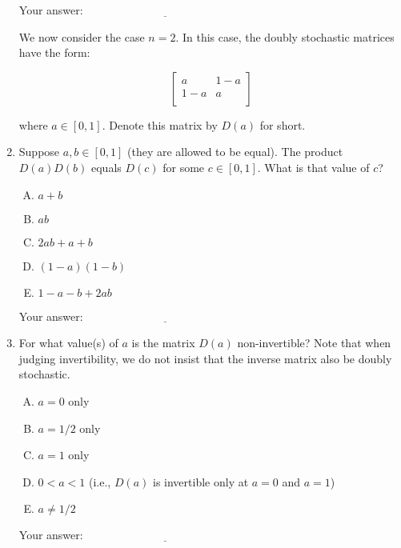 \documentclass[10pt]{amsart}
\begin{document}
\begin{enumerate}
  \vspace{0.1in}
  Your answer: $\underline{\qquad\qquad\qquad\qquad\qquad\qquad\qquad}$
  \vspace{0.6in}

  We now consider the case $n = 2$. In this case, the doubly
  stochastic matrices have the form:

  $$\left[ \begin{matrix} a & 1 - a \\ 1 - a & a \\\end{matrix}\right]$$

  where $a \in [0,1]$. Denote this matrix by $D(a)$ for short.

\item Suppose $a,b \in [0,1]$ (they are allowed to be equal). The
  product $D(a)D(b)$ equals $D(c)$ for some $c \in [0,1]$. What is
  that value of $c$?

  \begin{enumerate}[(A)]
  \item $a + b$
  \item $ab$
  \item $2ab + a + b$
  \item $(1 - a)(1 - b)$
  \item $1 - a - b + 2ab$
  \end{enumerate}

  \vspace{0.1in}
  Your answer: $\underline{\qquad\qquad\qquad\qquad\qquad\qquad\qquad}$
  \vspace{0.1in}

\item For what value(s) of $a$ is the matrix $D(a)$ non-invertible?
  Note that when judging invertibility, we do not insist that the
  inverse matrix also be doubly stochastic.

  \begin{enumerate}[(A)]
  \item $a = 0$ only
  \item $a = 1/2$ only
  \item $a = 1$ only
  \item $0 < a < 1$ (i.e., $D(a)$ is invertible only at $a = 0$ and $a
    = 1$)
  \item $a \ne 1/2$
  \end{enumerate}

  \vspace{0.1in}
  Your answer: $\underline{\qquad\qquad\qquad\qquad\qquad\qquad\qquad}$
  \vspace{0.1in}


\end{enumerate}
\end{document}
